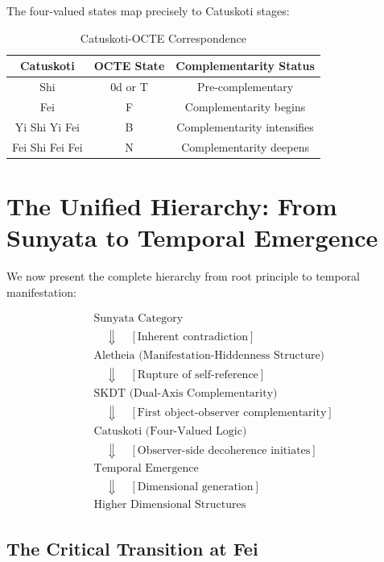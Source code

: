 \documentclass[12pt,a4paper]{article}
\begin{document}
The four-valued states map precisely to Catuskoti stages:

\begin{table}[htbp]
\centering
\begin{tabular}{|c|c|c|}
\hline
\textbf{Catuskoti} & \textbf{OCTE State} & \textbf{Complementarity Status} \\
\hline
Shi & 0d or T & Pre-complementary \\
\hline
Fei & F & Complementarity begins \\
\hline
Yi Shi Yi Fei & B & Complementarity intensifies \\
\hline
Fei Shi Fei Fei & N & Complementarity deepens \\
\hline
\end{tabular}
\caption{Catuskoti-OCTE Correspondence}
\end{table}

\section{The Unified Hierarchy: From Sunyata to Temporal Emergence}

We now present the complete hierarchy from root principle to temporal manifestation:

\begin{equation}
\begin{aligned}
&\text{Sunyata Category} \\
&\quad \Downarrow \quad [\text{Inherent contradiction}] \\
&\text{Aletheia (Manifestation-Hiddenness Structure)} \\
&\quad \Downarrow \quad [\text{Rupture of self-reference}] \\
&\text{SKDT (Dual-Axis Complementarity)} \\
&\quad \Downarrow \quad [\text{First object-observer complementarity}] \\
&\text{Catuskoti (Four-Valued Logic)} \\
&\quad \Downarrow \quad [\text{Observer-side decoherence initiates}] \\
&\text{Temporal Emergence} \\
&\quad \Downarrow \quad [\text{Dimensional generation}] \\
&\text{Higher Dimensional Structures}
\end{aligned}
\end{equation}

\subsection{The Critical Transition at Fei}
\end{document}
